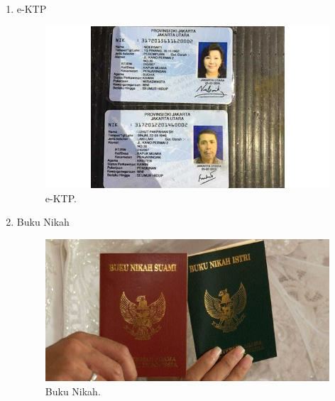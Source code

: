 \begin{enumerate}
	\item e-KTP
	\begin{figure}[H]
		\centering
		\includegraphics[width=12cm]{figures/ktp.jpg}
		\caption{e-KTP.}	
	\end{figure}

	\item Buku Nikah
	\begin{figure}[H]
		\centering
		\includegraphics[width=12cm]{figures/bukunikah.jpg}
		\caption{Buku Nikah.}	
	\end{figure}
\end{enumerate}